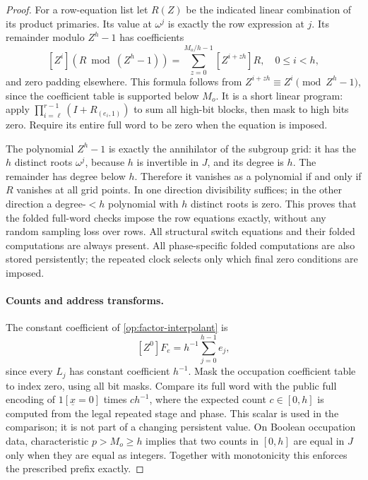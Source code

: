 \begin{proof}
For a row-equation list let $R(Z)$ be the indicated linear combination
of its product primaries.  Its value at $\omega^j$ is exactly the
row expression at $j$.  Its remainder modulo $Z^h-1$ has coefficients
\begin{equation}\label{op:remainder-fold}
       [Z^i](R\bmod(Z^h-1))
          =\sum_{z=0}^{M_o/h-1}[Z^{i+zh}]R,
                \quad 0\le i<h,
\end{equation}
and zero padding elsewhere.  This formula follows from
$Z^{i+zh}\equiv Z^i\pmod{Z^h-1}$, since the coefficient table is
supported below $M_o$.  It is a short linear program: apply
$\prod_{i=\ell}^{r-1}(I+R_{(e_i,1)})$ to sum all high-bit blocks,
then mask to high bits zero.  Require its entire full word to be
zero when the equation is imposed.

The polynomial $Z^h-1$ is exactly the annihilator of the subgroup grid:
it has the $h$ distinct roots $\omega^j$, because $h$ is invertible
in $J$, and its degree is $h$.  The remainder has degree below $h$.
Therefore it vanishes as a polynomial if and only if $R$ vanishes at
all grid points.  In one direction divisibility suffices; in the
other direction a degree-$<h$ polynomial with $h$ distinct roots
is zero.  This proves that the folded full-word checks impose the
row equations exactly, without any random sampling loss over rows.
All structural switch equations and their folded computations are
always present.  All phase-specific folded computations are also
stored persistently; the repeated clock selects only which final
zero conditions are imposed.

\paragraph{Counts and address transforms.}
The constant coefficient of \eqref{op:factor-interpolant} is
\begin{equation}\label{op:occupation-count}
                       [Z^0]F_e=h^{-1}\sum_{j=0}^{h-1}e_j,
\end{equation}
since every $L_j$ has constant coefficient $h^{-1}$.
Mask the occupation coefficient table to index zero, using all bit
masks.  Compare its full word with the public full encoding of
$1[\underline x=0]$ times $c h^{-1}$, where the expected count
$c\in[0,h]$ is computed from the legal repeated stage and phase.
This scalar is used in the comparison; it is not part of a changing
persistent value.  On Boolean occupation data, characteristic
$p>M_o\ge h$ implies that two counts in $[0,h]$ are equal in $J$
only when they are equal as integers.  Together with monotonicity
this enforces the prescribed prefix exactly.


\end{proof}

